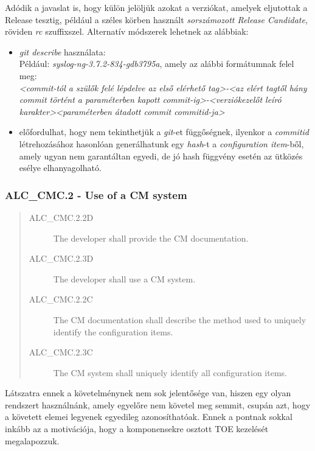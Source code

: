 Adódik a javaslat is, hogy külön jelöljük azokat a verziókat, amelyek eljutottak a Release tesztig,
például a széles körben használt \emph{sorszámozott Release Candidate}, röviden \emph{rc}
szuffixszel.
Alternatív módszerek lehetnek az alábbiak:
\begin{itemize}
    \item \emph{git describe} használata: \\
        Például: \emph{syslog-ng-3.7.2-834-gdb3795a}, amely az alábbi formátumnak felel meg: \\
        \emph{<commit-tól a szülők felé lépdelve az első elérhető tag>-<az elért tagtől hány commit
            történt a paraméterben kapott commit-ig>-<verziókezelőt leíró karakter><paraméterben
        átadott commit commitid-ja>}
    \item előfordulhat, hogy nem tekinthetjük a \emph{git}-et függőségnek, ilyenkor
        a \emph{commitid} létrehozásához hasonlóan generálhatunk egy \emph{hash}-t
        a \emph{configuration item}-ből, amely ugyan nem garantáltan egyedi, de jó hash függvény
        esetén az ütközés esélye elhanyagolható.
\end{itemize}

\pagebreak[3]
\subsubsection{ALC\_CMC.2 - Use of a CM system}

\begin{quote}
    \begin{description}
        \item[ALC\_CMC.2.2D]{The developer shall provide the CM documentation.}
        \item[ALC\_CMC.2.3D]{The developer shall use a CM system.}
        \item[ALC\_CMC.2.2C]{The CM documentation shall describe the method used to uniquely
            identify the configuration items.}
        \item[ALC\_CMC.2.3C]{The CM system shall uniquely identify all configuration items.}
    \end{description}
\end{quote}
Látszatra ennek a követelménynek nem sok jelentősége van, hiszen egy olyan rendszert használnánk,
amely egyelőre nem követel meg semmit, csupán azt, hogy a követett elemei legyenek egyedileg
azonosíthatóak. Ennek a pontnak sokkal inkább az a motivációja, hogy a komponensekre osztott TOE
kezelését megalapozzuk.

